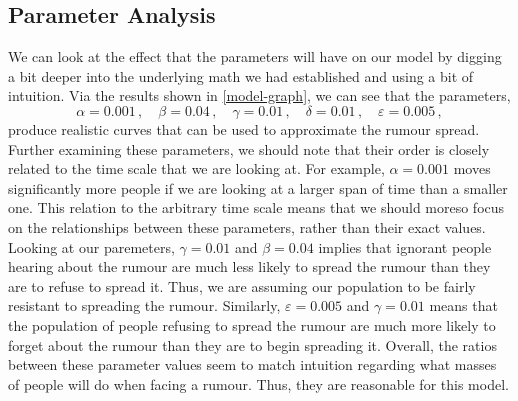 \documentclass[11pt]{article}
\begin{document}
\subsection{Parameter Analysis}
We can look at the effect that the parameters will have on our model by digging a bit deeper into the underlying math we had established and using a bit of intuition.
Via the results shown in \ref{model-graph}, we can see that the parameters,
\begin{equation*}
\label{model-parameters}
\alpha = 0.001 \, , \quad \beta = 0.04 \, , \quad \gamma = 0.01 \, , \quad \delta = 0.01 \, , \quad \varepsilon = 0.005 \, ,
\end{equation*}
produce realistic curves that can be used to approximate the rumour spread. 
Further examining these parameters, we should note that their order is closely related to the time scale that we are looking at.
For example, $\alpha = 0.001$ moves significantly more people if we are looking at a larger span of time than a smaller one.
This relation to the arbitrary time scale means that we should moreso focus on the relationships between these parameters, rather than their exact values.
Looking at our paremeters, $\gamma = 0.01$ and $\beta = 0.04$ implies that ignorant people hearing about the rumour are much less likely to spread the rumour than they are to refuse to spread it.
Thus, we are assuming our population to be fairly resistant to spreading the rumour.
Similarly, $\varepsilon = 0.005$ and $\gamma = 0.01$ means that the population of people refusing to spread the rumour are much more likely to forget about the rumour than they are to begin spreading it.
Overall, the ratios between these parameter values seem to match intuition regarding what masses of people will do when facing a rumour.
Thus, they are reasonable for this model.
\\
\end{document}
